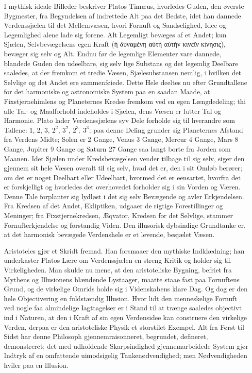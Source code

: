 \documentclass[12pt,a4paper]{book}
\begin{document}
I mythisk ideale Billeder beskriver Platos Timæus, hvorledes Guden, den
øverste Bygmester, fra Begyndelsen af indrettede Alt paa det Bedste,
idet han dannede Verdenssjælen til det Mellemvæsen, hvori Fornuft og
Sandselighed, Idee og Legemlighed alene lade sig forene. Alt Legemligt
bevæges af et Andet; kun Sjælen, Selvbevægelsens egen
Kraft (ἡ δυναμένη αὐτὴ αὑτὴν κινεῖν κίνησις), bevæger sig selv og Alt.
Endnu før de legemlige Elementer vare dannede, blandede Guden den
udeelbare, sig selv lige Substans og det legemlig Deelbare saaledes, at
der fremkom et tredie Væsen, Sjælesubstansen nemlig, i hvilken det
Selvlige og det Andet ere sammenføiede. Dette Hele deeltes nu efter
Grundtallene for det harmoniske og astronomiske System paa en saadan
Maade, at Fixstjernehimlens og Planeternes Kredse fremkom ved en egen
Længdedeling; thi alle Tal- og Maalforhold indeholdes i Sjælen, dens
Væsen er lutter Tal og Harmonie. Plato lader Verdenssjælens syv Dele
forholde sig til hverandre som Tallene: 1, 2, 3, $2^2$, $3^2$, $2^3$,
$3^3$; paa denne Deling grunder sig Planeternes Afstand fra Verdens
Midte; Solen er 2 Gange, Venus 3 Gange, Mercur 4 Gange, Mars 8 Gange,
Jupiter 9 Gange og Saturn 27 Gange saa langt borte fra Jorden som
Maanen. Idet Sjælen under Kredsbevægelsen vender tilbage til sig selv,
siger den gjennem sit hele Væsen overalt til sig selv, hvad det er, den
i sit Omløb berører; om det er noget Deelbart eller Udeelbart, hvormed
det er eensartet, hvorfra det er forskjelligt og hvorledes det
overhovedet forholder sig i sin Vorden og Væren. Denne Tale forplanter
sig lydløst i det sig selv Bevægende og avler Erkjendelsen. Fra Kredsen
af det Andet, Ekliptiken, udgaaer de rigtige Forestillinger og
Meninger; fra Fixstjernekredsen, Æqvator, Kredsen for det Selvlige,
stammer Fornufterkjendelse og forstandig Viden. Den illusorisk
dybsindige Grundtanke er, at det harmonisk bevægede Verdenshele er et
levende, besjælet Væsen.

Aristoteles gjør et Skridt fremad. Han forsmaaer den mythiske
Indklædning; han underkaster Platos Lære om Verdenssjælen en streng
Kritik og holder sig til Virkeligheden. Man skulde nu mene, at den
aristoteliske Bygning, befriet fra Mythens og Illusionens blændende
Lystaager, maatte staae fast paa Fornuftens Grund, og de virkelige
Omrids holde sig i Videnskabens klare Dag. Og dog er den hele
Objectivering en fuldstændig Illusion. Hvor lidt den menneskelige
Fornuft ved nogle faa almindelige Iagttagelser er i Stand til at trænge
saaledes objectivt ind i Naturen, at den i Kraft af sin egen
Verdensidee kan construere den virkelige Verden, derpaa er den
aristoteliske Physik et storstilet Exempel. Alt fra Først til Sidst har
denne Philosoph gjennemraisonneret, begrundet, defineret, demonstreret;
det med udholdende Skarpsindighed gjennemarbeidede System gjør Indtryk
af en omfattende uimodsigelig Tankenødvendighed; men Nødvendigheden
hviler paa en Illusion.
\end{document}
